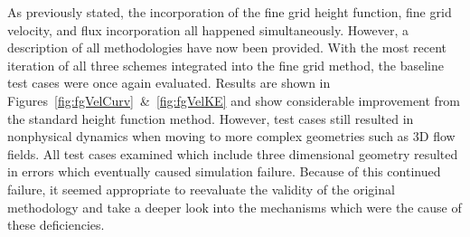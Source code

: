 As previously stated, the incorporation of the fine grid height function, fine grid velocity, and flux incorporation all happened simultaneously. However, a description of all methodologies have now been provided. With the most recent iteration of all three schemes integrated into the fine grid method, the baseline test cases were once again evaluated. Results are shown in Figures~\ref{fig:fgVelCurv}~\&~\ref{fig:fgVelKE} and show considerable improvement from the standard height function method. However, test cases still resulted in nonphysical dynamics when moving to more complex geometries such as 3D flow fields. All test cases examined which include three dimensional geometry resulted in errors which eventually caused simulation failure. Because of this continued failure, it seemed appropriate to reevaluate the validity of the original methodology and take a deeper look into the mechanisms which were the cause of these deficiencies.
